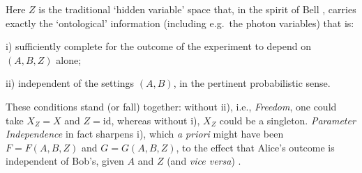 \documentclass[11pt]{article}
\begin{document}
\newpage
\noindent Here $Z$ is the traditional `hidden variable' space that, in the spirit of Bell \cite{Bell4,Norsen1,SU},
carries exactly the  `ontological' information (including e.g.\ the photon variables) that is:
\begin{description}
\item i)  sufficiently complete for the outcome of the experiment to depend on $(A,B,Z)$ alone; 
\item  ii) independent of the settings $(A,B)$, in the pertinent probabilistic sense.
\end{description}
These conditions stand (or fall) together: without ii), i.e., \emph{Freedom}, one could  take $X_Z=X$ and $Z=\mathrm{id}$, whereas without i), $X_Z$ could be a singleton. 
\emph{Parameter Independence} in fact  sharpens i), which \emph{a priori} might have been $F=F(A,B,Z)$ and $G=G(A,B,Z)$,  to the effect that Alice's outcome is independent of Bob's, given $A$ and $Z$ (and \emph{vice versa}) \cite{Bell1}.
\smallskip
\end{document}
